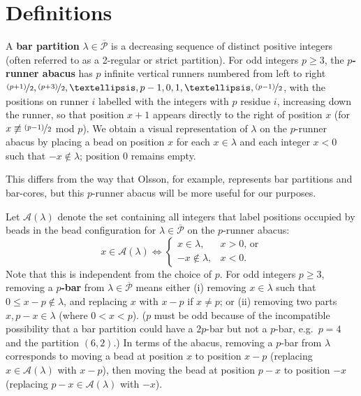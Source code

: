 \documentclass[10pt]{amsart}
\newcommand{\eg}{e.g.\ }
\begin{document}
\section{Definitions}
 
A \textbf{bar partition} $\lambda\in\overline{\mathcal{P}}$ is a decreasing sequence of distinct positive integers (often referred to as a 2-regular or strict partition). For odd integers $p\geq3$, the $p$\textbf{-runner abacus} \cite{F2} has $p$ infinite vertical runners numbered from left to right $\nicefrac{(p+1)}{2},\nicefrac{(p+3)}{2},\dots,p-1,0,1,\dots,\nicefrac{(p-1)}{2}$, with the positions on runner $i$ labelled with the integers with $p$ residue $i$, increasing down the runner, so that position $x+1$ appears directly to the right of position $x$ (for $x\not\equiv\nicefrac{(p-1)}{2}$ mod $p$). We obtain a visual representation of $\lambda$ on the $p$-runner abacus by placing a bead on position $x$ for each $x\in\lambda$ and each integer $x<0$ such that $-x\not\in\lambda$; position 0 remains empty. 

This differs from the way that Olsson, for example, represents bar partitions and bar-cores, but this $p$-runner abacus will be more useful for our purposes. 


Let $\mathcal{A}(\lambda)$ denote the set containing all integers that label positions occupied by beads in the bead configuration for $\lambda\in\overline{\mathcal{P}}$ on the $p$-runner abacus: 
$$x\in\mathcal{A}(\lambda)\Leftrightarrow\begin{cases}x\in\lambda,&x>0\text{, or}\\-x\not\in\lambda,&x<0.\end{cases}$$
Note that this is independent from the choice of $p$. 
\newline
For odd integers $p\geq3$, removing a $p$\textbf{-bar} from $\lambda\in\overline{\mathcal{P}}$ means either \newline
(i) removing $x\in\lambda$ such that $0\leq x-p\not\in\lambda$, and replacing $x$ with $x-p$ if $x\neq p$; or \newline
(ii) removing two parts $x,p-x\in\lambda$ (where $0<x<p$).
\newline
 ($p$ must be odd because of the incompatible possibility that a bar partition could have a $2p$-bar but not a $p$-bar, \eg $p=4$ and the partition $(6,2)$.) \newline
In terms of the abacus, removing a $p$-bar from $\lambda$ corresponds to moving a bead at position $x$ to position $x-p$ (replacing $x\in\mathcal{A}(\lambda)$ with $x-p$), then moving the bead at position $p-x$ to position $-x$ (replacing $p-x\in\mathcal{A}(\lambda)$ with $-x$). 
\end{document}
